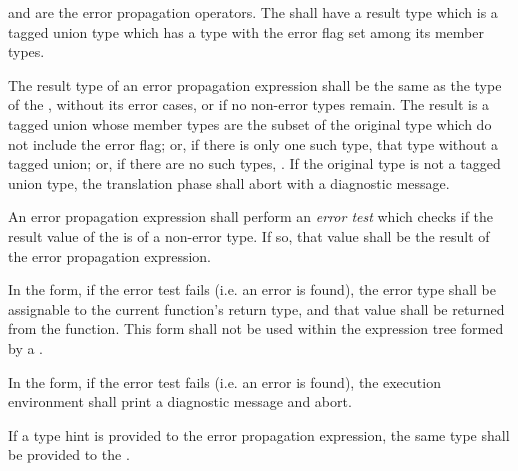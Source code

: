 \specsubsubitem
{} and \terminal{!} are the error propagation operators. The
 shall have a result type which is
a tagged union type which has a type with the error flag set
among its member types.

\specsubsubitem
The result type of an error propagation expression shall be the same as the
type of the , without its error cases, or
 if no non-error types remain. The result is a tagged union
whose member types are the subset of the original type which do not include the
error flag; or, if there is only one such type, that type without a tagged
union; or, if there are no such types, . If the original type is
not a tagged union type, the translation phase shall abort with a diagnostic
message.

\specsubsubitem
An error propagation expression shall perform an \textit{error test} which
checks if the result value of the  is of a
non-error type. If so, that value shall be the result of the error propagation
expression.

\specsubsubitem
In the  form, if the error test fails (i.e. an error is found), the
error type shall be assignable to the current function's return type, and that
value shall be returned from the function. This form shall not be used within
the expression tree formed by a .

\specsubsubitem
In the \terminal{!} form, if the error test fails (i.e. an error is found), the
execution environment shall print a diagnostic message and abort.

\specsubsubitem
If a type hint is provided to the error propagation expression, the same type
shall be provided to the .


\begin{grammar}
 \\
	 \\
	 \\
	 \\
	 \\
	 \\
	 \\

 \\
	 \\
	 \\
	 \\
	\terminal{(}  \terminal{)} \\
\end{grammar}

